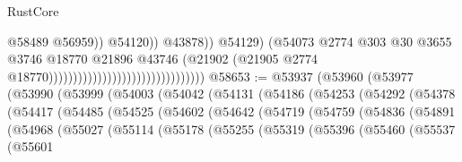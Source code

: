 \begin{lexlean}{RustCore}
\begin{coremodule}
                                                                            @58489
                                                                            @56959))
                                                                        @54120))
                                                                    @43878))
                                                                @54129)
                                                              (@54073
                                                                @2774
                                                                @303
                                                                @30
                                                                @3655
                                                                @3746
                                                                @18770
                                                                @21896
                                                                @43746
                                                                (@21902
                                                                  (@21905
                                                                    @2774
                                                                    @18770))))))))))))))))))))))))))))))))
@58653 := @53937
    (@53960
      (@53977
        (@53990
          (@53999
            (@54003
              (@54042
                (@54131
                  (@54186
                    (@54253
                      (@54292
                        (@54378
                          (@54417
                            (@54485
                              (@54525
                                (@54602
                                  (@54642
                                    (@54719
                                      (@54759
                                        (@54836
                                          (@54891
                                            (@54968
                                              (@55027
                                                (@55114
                                                  (@55178
                                                    (@55255
                                                      (@55319
                                                        (@55396
                                                          (@55460
                                                            (@55537
                                                              (@55601

\end{coremodule}
\end{lexlean}
